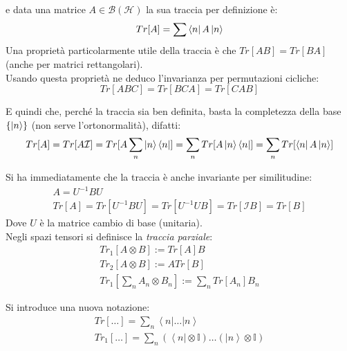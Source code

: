 e data una matrice $A \in \mathcal{B(\mathcal{H})}$ la sua traccia per definizione è:
$$
Tr[A] = \sum \bra{n}A\ket{n}
$$
Una proprietà particolarmente utile della traccia è che $Tr[AB]=Tr[BA]$ (anche per matrici rettangolari). \\
%
%
Usando questa proprietà ne deduco l'invarianza per permutazioni cicliche:
\begin{equation}
Tr[ABC]=Tr[BCA]=Tr[CAB]
\end{equation}

E quindi che, perché la traccia sia ben definita, basta la completezza della base $\{ \ket{n} \}$ (non serve l'ortonormalità), difatti:
 \begin{equation}
 Tr[A]=Tr[A\mathcal{I}]=Tr[A \sum_n \ket{n} \bra{n}]= \sum_n Tr[A \ket{n} \bra{n}] =\sum_n Tr[\bra{n} A \ket{n}]
 \end{equation}

Si ha immediatamente che la traccia è anche invariante per similitudine:
\begin{equation}\begin{split}
A=U^{-1} B U \\
Tr[A]=Tr[U^{-1}BU]=Tr[U^{-1}UB]=Tr[\mathcal{I}B]=Tr[B]
\end{split} \end{equation}
Dove $U$ è la matrice cambio di base (unitaria). \\
Negli spazi tensori si definisce la \emph{traccia parziale}:
\begin{gather}
Tr_1\left[A\otimes B\right]:=Tr\left[A\right]B \\
Tr_2\left[A\otimes B\right]:=ATr\left[B\right] \\
Tr_1\left[\sum_n{A_n\otimes B_n}\right]:=\sum_n{Tr\left[A_n\right]B_n}
\end{gather}

Si introduce una nuova notazione:
\begin{gather}
Tr\left[\dots\right]=\sum_n{\left\langle n|\dots |n \right\rangle} \\
Tr_1\left[\dots \right]=\sum_n{\left(\left\langle n\right |\otimes \mathbb{I}\right)\dots \left(\left |n \right\rangle\otimes \mathbb{I}\right)}
\end{gather}

